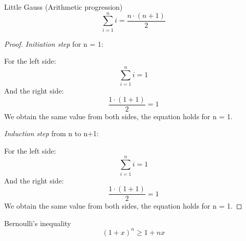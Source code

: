 \begin{enumerate}
\begin{example}Little Gauss (Arithmetic progression)
\begin{equation}
\sum_{i=1}^n i= \frac{n\cdot(n+1)}{2}
\end{equation}
\begin{proof}
\textit{Initiation step} for n = 1:

\noindent For the left side:
\begin{equation}
	\sum_{i=1}^n i= 1
\end{equation}
And the right side:
\begin{equation}
	\frac{1\cdot(1+1)}{2}=1
\end{equation}
We obtain the same value from both sides, the equation holds for n = 1.

\textit{Induction step} from n to n+1:

\noindent For the left side:
\begin{equation}
	\sum_{i=1}^n i= 1
\end{equation}
And the right side:
\begin{equation}
	\frac{1\cdot(1+1)}{2}=1
\end{equation}
We obtain the same value from both sides, the equation holds for n = 1.
\end{proof}
\end{example}
\begin{example}Bernoulli's inequality
\begin{equation}
(1+x)^n \ge 1+nx
\end{equation}
\end{example}
\end{enumerate}